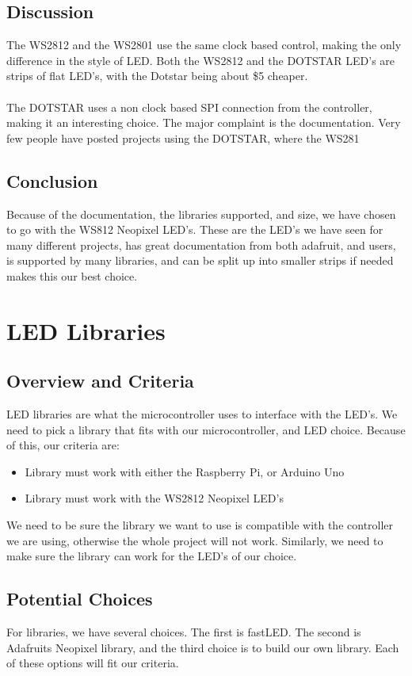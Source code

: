 \documentclass[onecolumn, draftclsnofoot,10pt, compsoc]{IEEEtran}
\begin{document}
		\subsection{Discussion}
		The WS2812 and the WS2801 use the same clock based control, making the only
		difference in the style of LED. Both the WS2812 and the DOTSTAR LED's are
		strips of flat LED's, with the Dotstar being about \$5 cheaper.
		\\\\
		The DOTSTAR uses a non clock based SPI connection from the controller,
		making it an interesting choice. The major complaint is the documentation.
		Very few people have posted projects using the DOTSTAR, where the WS281
		\subsection{Conclusion}
		Because of the documentation, the libraries supported, and size, we have
		chosen to go with the WS812 Neopixel LED's. These are the LED's we have
		seen for many different projects, has great documentation from both
		adafruit, and users, is supported by many libraries, and can be split up
		into smaller strips if needed makes this our best choice.

	\section{LED Libraries}
		\subsection{Overview and Criteria}
		LED libraries are what the microcontroller uses to interface with the LED's.
		We need to pick a library that fits with our microcontroller, and LED
		choice. Because of this, our criteria are:
		\begin{itemize}
			\item Library must work with either the Raspberry Pi, or Arduino Uno
			\item Library must work with the WS2812 Neopixel LED's
		\end{itemize}
		We need to be sure the library we want to use is compatible with the
		controller we are using, otherwise the whole project will not work.
		Similarly, we need to make sure the library can work for the LED's of our
		choice.
		\subsection{Potential Choices}
		For libraries, we have several choices. The first is fastLED. The second is
		Adafruits Neopixel library, and the third choice is to build our own
		library. Each of these options will fit our criteria.
\end{document}
